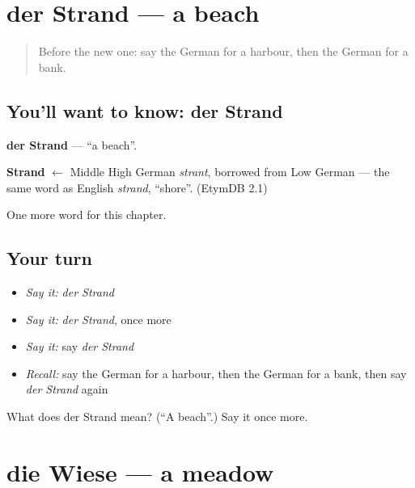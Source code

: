 \section[der Strand]{der Strand — a beach}

\label{lesson:GE-C196-strand}



\begin{quote}
Before the new one: say the German for a harbour, then the German for a bank.
\end{quote}

\subsection*{You'll want to know: der Strand}
\textbf{der Strand} — \textquotedblleft{}a beach\textquotedblright{}.

\begin{cousinweb}
\textbf{Strand} $\leftarrow$ Middle High German \emph{strant}, borrowed from Low German — the same word as English \emph{strand}, \textquotedblleft{}shore\textquotedblright{}. (EtymDB 2.1)
\end{cousinweb}

\begin{grammarlens}[title={What you've built}]
One more word for this chapter.
\end{grammarlens}

\subsection*{Your turn}
\begin{itemize}
\raggedright
  \item \emph{Say it:} \emph{der Strand}
  \item \emph{Say it:} \emph{der Strand}, once more
  \item \emph{Say it:} say \emph{der Strand}
  \item \emph{Recall:} say the German for a harbour, then the German for a bank, then say \emph{der Strand} again
\end{itemize}

\begin{tcolorbox}[breakable,colback=teal!4,colframe=teal!35!black,title={Before you move on}]
What does der Strand mean? (\textquotedblleft{}A beach\textquotedblright{}.) Say it once more.
\end{tcolorbox}
\section[die Wiese]{die Wiese — a meadow}

